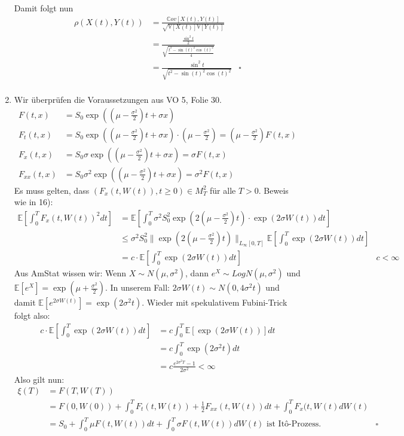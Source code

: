 \documentclass[a4paper,11pt,notitlepage,fullpage]{article}
\newcommand{\Ee}[1]{\mathbb E\left[#1\right]}
\newcommand{\Vv}[1]{\mathbb V\left[#1\right]}
\newcommand{\Cov}[1]{\mathbb Cov\left[#1\right]}
\begin{document}
\begin{enumerate}
Damit folgt nun
\begin{align*}
\rho(X(t), Y(t)) &= \frac{\Cov{X(t), Y(t)}}{\sqrt{\Vv{X(t)}\Vv{Y(t)}}} \\
&= \frac{\frac{\sin^2t}{2}}{\sqrt{ \frac{t^2 - \sin(t)^2\cos(t)^2}{4} }} \\
&= \frac{\sin^2t}{\sqrt{ t^2 - \sin(t)^2\cos(t)^2}}  &\square\\
\end{align*}

\item Wir überprüfen die Voraussetzungen aus VO 5, Folie 30.
\begin{align*}
F(t, x) &= S_0 \exp\left(\left(\mu - \frac{\sigma^2}{2}\right)t + \sigma x\right) \\
F_t(t, x) &= S_0 \exp\left(\left(\mu - \frac{\sigma^2}{2}\right)t + \sigma x\right) \cdot \left(\mu - \frac{\sigma^2}{2}\right) = \left(\mu - \frac{\sigma^2}{2}\right) F(t, x)\\
F_x(t, x) &= S_0 \sigma \exp\left(\left(\mu - \frac{\sigma^2}{2}\right)t + \sigma x\right) = \sigma F(t, x) \\
F_{xx}(t, x) &= S_0 \sigma^2 \exp\left(\left(\mu - \frac{\sigma^2}{2}\right)t + \sigma x\right) = \sigma^2 F(t, x)
\end{align*}
Es muss gelten, dass $(F_x(t, W(t)), t \geq 0) \in M_T^2$ für alle $T > 0$. Beweis wie in 16):
\begin{align*}
\Ee{\int_0^T F_x(t, W(t))^2 dt} &= \Ee{\int_0^T \sigma^2 S_0^2 \exp(2(\mu - \frac{\sigma^2}{2}) t) \cdot \exp(2\sigma W(t)) dt} \\
&\leq  \sigma^2 S_0^2 \|\exp(2(\mu - \frac{\sigma^2}{2}) t)\|_{L_\infty[0, T]} \Ee{\int _0^T \exp(2\sigma W(t)) dt} \\
&= c \cdot \Ee{\int _0^T \exp(2\sigma W(t)) dt} &c < \infty
\end{align*}
Aus AmStat wissen wir: Wenn $X\sim N(\mu, \sigma^2)$, dann $e^X \sim LogN(\mu, \sigma^2)$ und $\Ee{e^X} = \exp(\mu + \frac{\sigma^2}{2})$. In unserem Fall: $2\sigma W(t) \sim N(0, 4\sigma^2 t)$ und damit $\Ee{e^{2\sigma W(t)}} =  \exp(2\sigma^2 t)$. Wieder mit spekulativem Fubini-Trick folgt also:
\begin{align*}
c \cdot \Ee{\int _0^T \exp(2\sigma W(t)) dt} &= c \int _0^T \Ee{\exp(2\sigma W(t))} dt \\
&= c \int _0^T \exp(2\sigma^2 t) dt \\
&= c \frac{e^{2\sigma^2 T}-1}{2\sigma^2} < \infty
\end{align*}
Also gilt nun:
\begin{align*}
\xi(T) &= F(T, W(T)) \\
&= F(0, W(0)) + \int_0^T F_t(t, W(t)) + \frac{1}{2} F_{xx}(t, W(t)) dt + \int_0^T F_x(t, W(t) dW(t) \\
&= S_0 + \int_0^T \mu F(t, W(t)) dt + \int_0^T \sigma F(t, W(t)) dW(t) \text{ ist Itô-Prozess.}&\square
\end{align*}


\end{enumerate}
\end{document}

